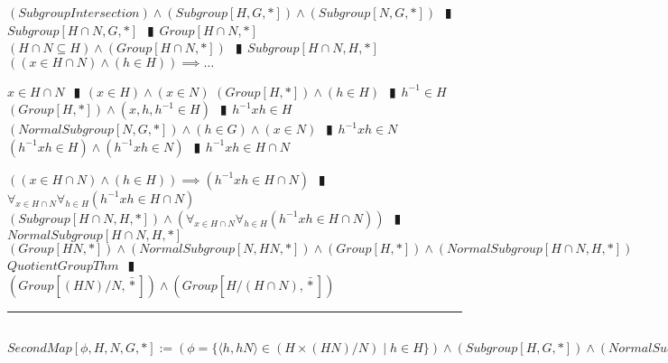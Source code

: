 \documentclass{book}
\newcommand{\abr}{:=}
\newcommand{\pipe}{$\phantom{(}\vrectangleblack\phantom{)}$}
\newcommand{\pr}[1]{\left(#1\right)}
\newcommand{\bbin}[1]{\mathbin{{\bar{#1}}}}
\newcommand{\st}{\mathbin{|}}
\begin{document}
\begin{enumerate}
  \lit $(SubgroupIntersection) \land (Subgroup[H, G, *]) \land (Subgroup[N, G, *])$ \pipe $Subgroup[H \cap N, G, *]$ \pipe $Group[H \cap N, *]$
  \lit $(H \cap N \subseteq H) \land (Group[H \cap N, *])$ \pipe $Subgroup[H \cap N, H, *]$
  \lit $\pr{(x \in H \cap N) \land (h \in H)} \implies \ldots$
  \begin{enumerate}
    \lit $x \in H \cap N$ \pipe $(x \in H) \land (x \in N)$
    \lit $(Group[H, *]) \land (h \in H)$ \pipe $h^{-1} \in H$
    \lit $(Group[H, *]) \land (x, h, h^{-1} \in H)$ \pipe $h^{-1} x h \in H$
    \lit $(NormalSubgroup[N, G, *]) \land (h \in G) \land (x \in N)$ \pipe $h^{-1} x h \in N$
    \lit $(h^{-1} x h \in H) \land (h^{-1} x h \in N)$ \pipe $h^{-1} x h \in H \cap N$
  \end{enumerate}
  \lit $\pr{(x \in H \cap N) \land (h \in H)} \implies (h^{-1} x h \in H \cap N)$ \pipe $\forall_{x \in H \cap N} \forall_{h \in H}(h^{-1} x h \in H \cap N)$
  \lit $(Subgroup[H \cap N, H, *]) \land \pr{\forall_{x \in H \cap N} \forall_{h \in H}(h^{-1} x h \in H \cap N)}$ \pipe $NormalSubgroup[H \cap N, H, *]$
  \lit $(Group[H N, *]) \land (NormalSubgroup[N, H N, *]) \land (Group[H, *]) \land (NormalSubgroup[H \cap N, H, *])$
  \lit $QuotientGroupThm$ \pipe $\pr{Group[(H N) / N, \bbin{*}]} \land \pr{Group[H / (H \cap N), \bbin{*}]}$
\end{enumerate} \vspace{.75mm} \hrule \vspace{.75mm} \ \\

$SecondMap[\phi, H, N, G, *] \abr \pr{\phi = \{\langle h, h N \rangle \in \pr{H \times (H N) / N} \st h \in H\}} \land (Subgroup[H, G, *]) \land (NormalSubgroup[N, G, *])$ \\
\end{document}
